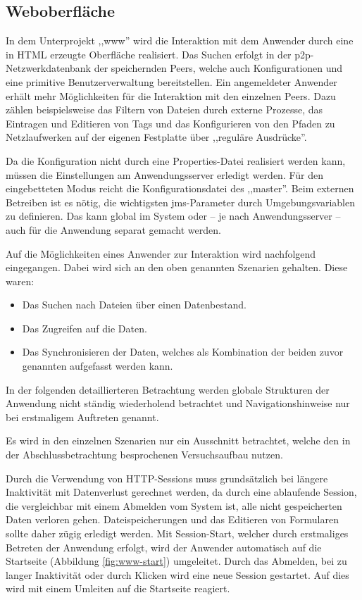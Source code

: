 \documentclass[oneside, ngerman, toc=bibliography,bibliography=totoc,listof=entryprefix, open=right,numbers=noenddot,fontsize=12pt]{scrbook}
\begin{document}
\subsection{Weboberfläche}
In dem Unterprojekt ,,www'' wird die Interaktion mit dem Anwender durch eine in HTML erzeugte Oberfläche realisiert.
Das Suchen erfolgt in der \acrshort{p2p}-Netzwerkdatenbank der speichernden Peers, welche auch Konfigurationen und eine primitive Benutzerverwaltung bereitstellen.
Ein angemeldeter Anwender erhält mehr Möglichkeiten für die Interaktion mit den einzelnen Peers. Dazu zählen beispielsweise das Filtern von Dateien durch externe Prozesse, das Eintragen und Editieren von Tags und das Konfigurieren von den Pfaden zu Netzlaufwerken auf der eigenen Festplatte über ,,reguläre Ausdrücke''.

Da die Konfiguration nicht durch eine Properties-Datei realisiert werden kann, müssen die Einstellungen am Anwendungsserver erledigt werden. Für den eingebetteten Modus reicht die Konfigurationsdatei des ,,master''. Beim externen Betreiben ist es nötig, die wichtigsten \acrshort{jms}-Parameter durch Umgebungsvariablen zu definieren. Das kann global im System oder -- je nach Anwendungsserver -- auch für die Anwendung separat gemacht werden.

Auf die Möglichkeiten eines Anwender zur Interaktion wird nachfolgend eingegangen.
Dabei wird sich an den oben genannten Szenarien gehalten. Diese waren:

\begin{itemize}
    \item Das Suchen nach Dateien über einen Datenbestand.
    \item Das Zugreifen auf die Daten.
    \item Das Synchronisieren der Daten, welches als Kombination der beiden zuvor genannten aufgefasst werden kann.
\end{itemize}

In der folgenden detaillierteren Betrachtung werden globale Strukturen der Anwendung nicht ständig wiederholend betrachtet und Navigationshinweise nur bei erstmaligem Auftreten genannt.

Es wird in den einzelnen Szenarien nur ein Ausschnitt betrachtet, welche den in der Abschlussbetrachtung besprochenen Versuchsaufbau nutzen.

Durch die Verwendung von HTTP-Sessions muss grundsätzlich bei längere Inaktivität mit Datenverlust gerechnet werden, da durch eine ablaufende Session, die vergleichbar mit einem Abmelden vom System ist, alle nicht gespeicherten Daten verloren gehen.
Dateispeicherungen und das Editieren von Formularen sollte daher zügig erledigt werden. Mit Session-Start, welcher durch erstmaliges Betreten der Anwendung erfolgt,  wird der Anwender automatisch auf die Startseite (Abbildung \ref{fig:www-start}) umgeleitet. Durch das Abmelden, bei zu langer Inaktivität oder durch Klicken wird eine neue Session gestartet. Auf dies wird mit einem Umleiten auf die Startseite reagiert.
\end{document}
